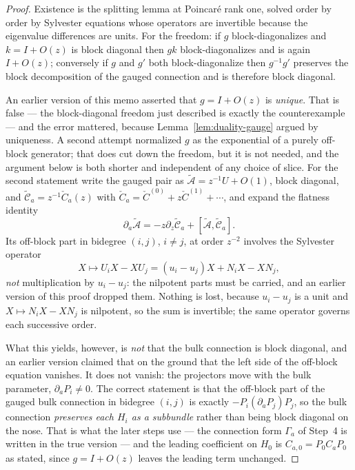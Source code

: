 \documentclass[11pt]{article}
\theoremstyle{definition}
\theoremstyle{remark}
\begin{document}
\begin{proof}
Existence is the splitting lemma at Poincar\'e rank one, solved order by order by
Sylvester equations whose operators are invertible because the eigenvalue
differences are units. For the freedom: if $g$ block-diagonalizes and $k=I+O(z)$
is block diagonal then $gk$ block-diagonalizes and is again $I+O(z)$; conversely
if $g$ and $g'$ both block-diagonalize then $g^{-1}g'$ preserves the block
decomposition of the gauged connection and is therefore block diagonal.

An earlier version of this memo asserted that $g=I+O(z)$ is \emph{unique}. That is
false --- the block-diagonal freedom just described is exactly the
counterexample --- and the error mattered, because
Lemma~\ref{lem:duality-gauge} argued by uniqueness. A second attempt normalized
$g$ as the exponential of a purely off-block generator; that does cut down the
freedom, but it is not needed, and the argument below is both shorter and
independent of any choice of slice. For the second statement write
the gauged pair as $\widetilde{\mathcal A}=z^{-1}U+O(1)$, block diagonal, and
$\widetilde{\mathcal C}_a=z^{-1}\check C_a(z)$ with
$\check C_a=\check C^{(0)}+z\check C^{(1)}+\cdots$, and expand the flatness
identity
\[
  \partial_a\widetilde{\mathcal A}
  =-z\partial_z\widetilde{\mathcal C}_a
  +[\widetilde{\mathcal A},\widetilde{\mathcal C}_a].
  \tag{8.1}
  \label{eq:flat-pair}
\]
Its off-block part in bidegree $(i,j)$, $i\ne j$, at order $z^{-2}$ involves the
Sylvester operator
\[
  X\longmapsto U_iX-XU_j=(u_i-u_j)X+N_iX-XN_j,
\]
\emph{not} multiplication by $u_i-u_j$: the nilpotent parts must be carried, and
an earlier version of this proof dropped them. Nothing is lost, because
$u_i-u_j$ is a unit and $X\mapsto N_iX-XN_j$ is nilpotent, so the sum is
invertible; the same operator governs each successive order.

What this yields, however, is \emph{not} that the bulk connection is block
diagonal, and an earlier version claimed that on the ground that the left side of
the off-block equation vanishes. It does not vanish: the projectors move with the
bulk parameter, $\partial_aP_i\ne0$. The correct statement is that the off-block
part of the gauged bulk connection in bidegree $(i,j)$ is exactly
$-P_i(\partial_aP_j)P_j$, so the bulk connection \emph{preserves each $H_i$ as a
subbundle} rather than being block diagonal on the nose. That is what the later
steps use --- the connection form $\Gamma_a$ of Step~4 is written in the true
version --- and the leading coefficient on $H_0$ is $C_{a,0}=P_0C_aP_0$ as
stated, since $g=I+O(z)$ leaves the leading term unchanged.
\end{proof}
\end{document}
